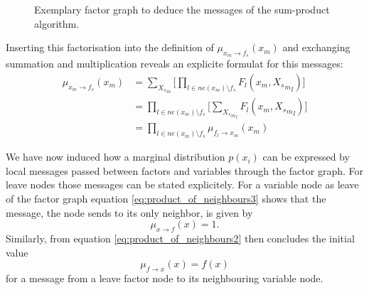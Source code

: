 \documentclass{sigkdd}
\begin{document}
\begin{figure}[h]
	\centering
	\caption{Exemplary factor graph to deduce the messages of the sum-product algorithm.}\label{fig:message3}
\end{figure}

Inserting this factorisation into the definition of $\mu_{x_m \rightarrow f_s}(x_m)$ and exchanging summation and multiplication reveals an explicite formulat for this messages:
\begin{equation}\label{eq:product_of_neighbours3}
    \begin{split}
        \mu_{x_m \rightarrow f_s}(x_m) &=\sum_{{X_s}_m} \Big[ \prod_{l \in ne(x_m) \setminus f_s} F_l(x_m, {{X_s}_m}_l) \Big] \\ &= \prod_{l \in ne(x_m) \setminus f_s} \Big[\sum_{{{X_s}_m}_l} F_l(x_m, {{X_s}_m}_l) \Big] \\ &= \prod_{l \in ne(x_m) \setminus f_s} \mu_{f_l \rightarrow x_m}(x_m)
    \end{split}
\end{equation}

We have now induced how a marginal distribution $p(x_i)$ can be expressed by local messages passed between factors and variables through the factor graph. For leave nodes those messages can be stated explicitely.
For a variable node as leave of the factor graph equation \ref{eq:product_of_neighbours3} shows that the message, the node sends to its only neighbor, is given by
\begin{equation}\label{eq:product_of_neighbours3}
\mu_{x \rightarrow f}(x) = 1.
\end{equation}
Similarly, from equation \ref{eq:product_of_neighbours2} then concludes the initial value
\begin{equation}\label{eq:product_of_neighbours3}
\mu_{f \rightarrow x}(x) = f(x)
\end{equation}
for a message from a leave factor node to its neighbouring variable node.
\end{document}
